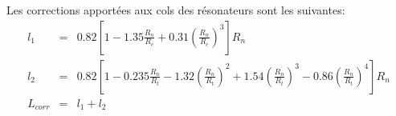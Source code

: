 \bigskip
Les corrections apportées aux cols des résonateurs sont les suivantes:
\begin{eqnarray*}
l_1 & = &  0.82 \left[ 1 - 1.35 \frac{R_n}{R_c} + 0.31 \left(\frac{R_n}{R_c} \right)^3  \right] R_n \\
l_2 & = &  0.82 \left[ 1 - 0.235 \frac{R_n}{R_t} - 1.32 \left( \frac{R_n}{R_t} \right)^2 +1.54 \left( \frac{R_n}{R_t}\right)^3 - 0.86 \left( \frac{R_n}{R_t}\right)^4  \right] R_n \\
L_{corr} & = &  l_1 + l_2
\end{eqnarray*}
